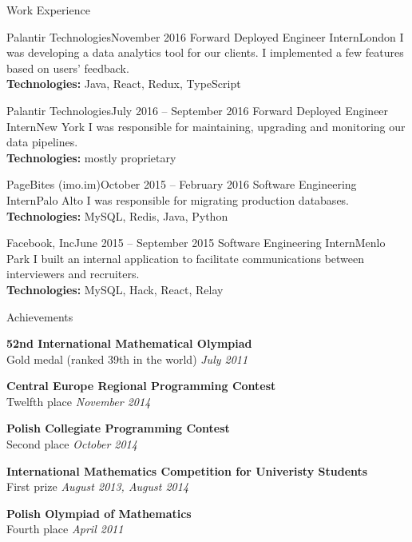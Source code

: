 \documentclass{resume} %
\begin{document}
\begin{rSection}{Work Experience}

\begin{rSubsection}{Palantir Technologies}{November 2016}
    {Forward Deployed Engineer Intern}{London}
    {
    I was developing a data analytics tool for our clients. I implemented a few features based on users' feedback.
    \\
    {\bf Technologies:} Java, React, Redux, TypeScript
    }
\end{rSubsection}

\begin{rSubsection}{Palantir Technologies}{July 2016 -- September 2016}
    {Forward Deployed Engineer Intern}{New York}
    {
    I was responsible for maintaining, upgrading and monitoring our data pipelines.
    \\
    {\bf Technologies:} mostly proprietary
    }
\end{rSubsection}

\begin{rSubsection}{PageBites (imo.im)}{October 2015 -- February 2016}
    {Software Engineering Intern}{Palo Alto}
    {
    I was responsible for migrating production databases.
    \\
    {\bf Technologies:} MySQL, Redis, Java, Python
    }
\end{rSubsection}

\begin{rSubsection}{Facebook, Inc}{June 2015 -- September 2015}
    {Software Engineering Intern}{Menlo Park}
    {
    I built an internal application to facilitate communications between interviewers and recruiters.
    \\
    {\bf Technologies:} MySQL, Hack, React, Relay
    }
\end{rSubsection}

\end{rSection}


\begin{rSection}{Achievements}

{\bf 52nd International Mathematical Olympiad}
\\
{Gold medal (ranked 39th in the world)} \hfill{\em July 2011}

{\bf Central Europe Regional Programming Contest}
\\
{Twelfth place} \hfill{\em November 2014}

{\bf Polish Collegiate Programming Contest}
\\
{Second place} \hfill{\em October 2014}

{\bf International Mathematics Competition for Univeristy Students}
\\
{First prize} \hfill{\em August 2013, August 2014}

{\bf Polish Olympiad of Mathematics}
\\
{Fourth place} \hfill{\em April 2011}

\end{rSection}
\end{document}
